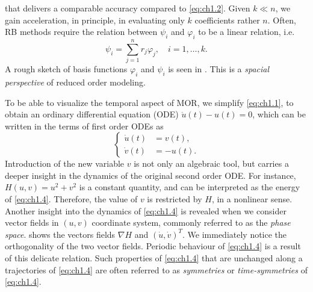 that delivers a comparable accuracy compared to \eqref{eq:ch1.2}. Given $k \ll n$, we gain acceleration, in principle, in evaluating only $k$ coefficients rather $n$. Often, RB methods require the relation between $\psi_i$ and $\varphi_i$ to be a linear relation, i.e.
\begin{equation} \label{eq:ch1.3.1}
	\psi_i = \sum_{j=1}^n r_j \varphi_j, \quad i=1,\dots,k.
\end{equation}
A rough sketch of basis functions $\varphi_i$ and $\psi_i$ is seen in . This is a \emph{spacial perspective} of reduced order modeling.

To be able to visualize the temporal aspect of MOR, we simplify \eqref{eq:ch1.1}, to obtain an ordinary differential equation (ODE) $\ddot u(t) - u(t) = 0$, which can be written in the terms of first order ODEs as
\begin{equation} \label{eq:ch1.4}
	\left\{
	\begin{aligned}
		\dot u(t) &= v(t), \\
		\dot v(t) &= -u(t).
	\end{aligned}
	\right.
\end{equation}
Introduction of the new variable $v$ is not only an algebraic tool, but carries a deeper insight in the dynamics of the original second order ODE. For instance, $H(u,v) = u^2 + v^2$ is a constant quantity, and can be interpreted as the energy of \eqref{eq:ch1.4}. Therefore, the value of $v$ is restricted by $H$, in a nonlinear sense. Another insight into the dynamics of \eqref{eq:ch1.4} is revealed when we consider vector fields in $(u,v)$ coordinate system, commonly referred to as the \emph{phase space}.  shows the vectors fields $\nabla H$ and $(\dot u, \dot v)^T$. We immediately notice the orthogonality of the two vector fields. Periodic behaviour of \eqref{eq:ch1.4} is a result of this delicate relation. Such properties of \eqref{eq:ch1.4} that are unchanged along a trajectories of \eqref{eq:ch1.4} are often referred to as \emph{symmetries} or \emph{time-symmetries} of \eqref{eq:ch1.4}.
